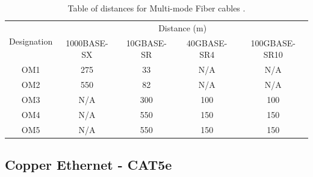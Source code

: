 \begin{table}[H]
    \centering
    \begin{tabular}{|ccccc|}
    \hline
    \multicolumn{1}{|c|}{\multirow{2}{*}{Designation}} & \multicolumn{4}{c|}{Distance (m)}                                                                                \\ \cline{2-5} 
    \multicolumn{1}{|c|}{}                             & \multicolumn{1}{c|}{1000BASE-SX} & \multicolumn{1}{c|}{10GBASE-SR} & \multicolumn{1}{c|}{40GBASE-SR4} & 100GBASE-SR10 \\ \hline
    OM1                                                & 275                            & 33                              & N/A                             & N/A         \\ \hline
    OM2                                                & 550                            & 82                              & N/A                             & N/A         \\ \hline
    OM3                                                & N/A                            & 300                             & 100                             & 100         \\ \hline
    OM4                                                & N/A                            & 550                             & 150                             & 150         \\ \hline
    OM5                                                & N/A                            & 550                             & 150                             & 150         \\ \hline
    \end{tabular}
    \caption{Table of distances for Multi-mode Fiber cables \parencite{mm-fiber-stats}.}
    \label{tab:fiber_distance}
\end{table}
\subsection{Copper Ethernet - CAT5e}

